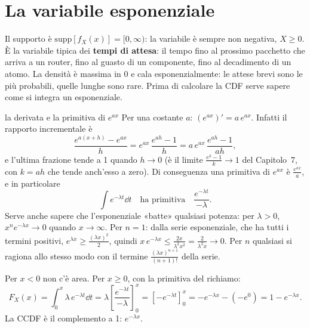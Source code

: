 \section{La variabile esponenziale}


Il supporto è $\mathrm{supp}[f_X(x)] = [0, \infty)$: la variabile è sempre non negativa, $X \geq 0$. È la variabile
tipica dei \textbf{tempi di attesa}: il tempo fino al prossimo pacchetto che arriva a un router, fino al guasto di un
componente, fino al decadimento di un atomo. La densità è massima in 0 e cala esponenzialmente: le attese brevi sono le
più probabili, quelle lunghe sono rare. Prima di calcolare la CDF serve sapere come si integra un esponenziale.

\begin{richiamo}{la derivata e la primitiva di $e^{ax}$}
Per una costante $a$: $\left(e^{ax}\right)' = a\, e^{ax}$. Infatti il rapporto incrementale è
\[ \frac{e^{a(x+h)} - e^{ax}}{h} = e^{ax}\, \frac{e^{ah} - 1}{h} = a\, e^{ax}\, \frac{e^{ah} - 1}{ah} , \]
e l'ultima frazione tende a 1 quando $h \to 0$ (è il limite $\frac{e^k - 1}{k} \to 1$ del Capitolo~7, con $k = ah$ che
tende anch'esso a zero). Di conseguenza una primitiva di $e^{ax}$ è $\frac{e^{ax}}{a}$, e in particolare
\[ \int e^{-\lambda t} \dd t \quad\text{ha primitiva}\quad \frac{e^{-\lambda t}}{-\lambda} . \]
Serve anche sapere che l'esponenziale «batte» qualsiasi potenza: per $\lambda > 0$, $x^n e^{-\lambda x} \to 0$ quando
$x \to \infty$. Per $n = 1$: dalla serie esponenziale, che ha tutti i termini positivi, $e^{\lambda x} \geq
\frac{(\lambda x)^2}{2}$, quindi $x\, e^{-\lambda x} \leq \frac{2x}{\lambda^2 x^2} = \frac{2}{\lambda^2 x} \to 0$. Per
$n$ qualsiasi si ragiona allo stesso modo con il termine $\frac{(\lambda x)^{n+1}}{(n+1)!}$ della serie.
\end{richiamo}


\begin{dimostrazione}
\passo{} Per $x < 0$ non c'è area. Per $x \geq 0$, con la primitiva del richiamo:
\[ F_X(x) = \int_0^x \lambda\, e^{-\lambda t} \dd t = \lambda \left[ \frac{e^{-\lambda t}}{-\lambda} \right]_0^x =
   \left[ -e^{-\lambda t} \right]_0^x = -e^{-\lambda x} - (-e^0) = 1 - e^{-\lambda x} . \]
La CCDF è il complemento a 1: $e^{-\lambda x}$.
\end{dimostrazione}

